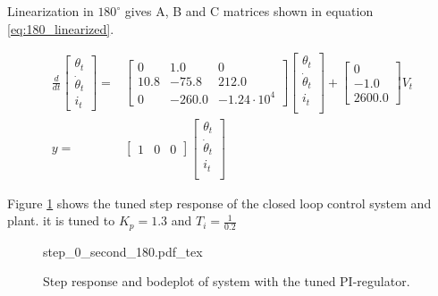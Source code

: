 \documentclass[../../../Main]{subfiles}
\begin{document}
Linearization in $180^\circ$ gives A, B and C matrices shown in equation \ref{eq:180_linearized}.

\begin{equation}
      \label{eq:180_linearized}
      \begin{split}
      \frac{d}{dt}
    \begin{bmatrix}
        \theta_t \\
        \dot \theta_t \\
        i_t
    \end{bmatrix}
    =&
    \begin{bmatrix}0 & 1.0 & 0\\ 10.8 & -75.8 & 212.0\\ 0 & -260.0 & -1.24\cdot10^4 \end{bmatrix}
    \begin{bmatrix}
        \theta_t \\
        \dot \theta_t \\
        i_t \\
    \end{bmatrix}
    +
    \begin{bmatrix}
    0\\ -1.0\\ 2600.0
    \end{bmatrix}
    V_t
\\
      y =&
    \begin{bmatrix}
        1 & 0 & 0
    \end{bmatrix}
    \begin{bmatrix}
        \theta_t \\
        \dot \theta_t\\
        i_t\\
    \end{bmatrix}
    \end{split}
\end{equation}


Figure \ref{fig:step_0_second_180} shows the tuned step response of the closed loop control system and plant.
it is tuned to $K_p = 1.3$ and $T_i = \frac{1}{0.2}$
\begin{figure}[H]
\centering
\def\svgwidth{\textwidth}
{step_0_second_180.pdf_tex}
\caption{Step response and bodeplot of system with the tuned PI-regulator.}
\label{fig:step_0_second_180}
\end{figure}
\end{document}
